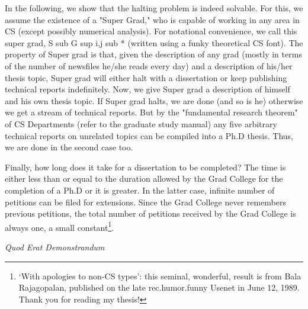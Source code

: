 In the following, we show that the halting problem is indeed solvable. For this, we assume the existence of a "Super Grad," who is capable of working in any area in CS (except possibly numerical analysis). For notational convenience, we call this super grad, S sub G sup i,j sub * (written using a funky theoretical CS font). The property of Super grad is that, given the description of any grad (mostly in terms of the number of newsfiles he/she reads every day) and a description of his/her thesis topic, Super grad will either halt with a dissertation or keep publishing technical reports indefinitely. Now, we give Super grad a description of himself and his own thesis topic. If Super grad halts, we are done (and so is he) otherwise we get a stream of technical reports. But by the "fundamental research theorem" of CS Departments (refer to the graduate study manual) any five arbitrary technical reports on unrelated topics can be compiled into a Ph.D thesis. Thus, we are done in the second case too.

Finally, how long does it take for a dissertation to be completed? The time is either less than or equal to the duration allowed by the Grad College for the completion of a Ph.D or it is greater. In the latter case, infinite number of petitions can be filed for extensions. Since the Grad College never remembers previous petitions, the total number of petitions received by the Grad College is always one, a small constant\footnote{`With apologies to non-CS types': this seminal, wonderful, result is from Bala Rajagopalan, published on the late rec.humor.funny Usenet in June 12, 1989.  Thank you for reading my thesis!}.

\bigskip
\bigskip
\bigskip
\bigskip
\bigskip
\bigskip
\bigskip
\bigskip
\bigskip
\bigskip
\bigskip
\bigskip

\hfill \emph{Quod Erat Demonstrandum}
